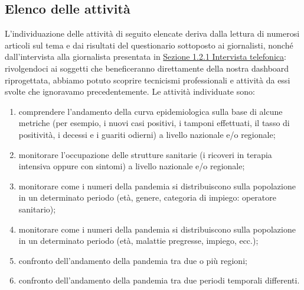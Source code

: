 \subsection{Elenco delle attività}
\label{ss:elenco-attivita}
L'individuazione delle attività di seguito elencate deriva dalla lettura di numerosi articoli sul tema e dai risultati del questionario sottoposto ai giornalisti, nonché dall'intervista alla giornalista presentata in \hyperref[ss:intervista-telefonica]{Sezione 1.2.1 Intervista telefonica}: rivolgendoci ai soggetti che beneficeranno direttamente della nostra dashboard riprogettata, abbiamo potuto scoprire tecnicismi professionali e attività da essi svolte che ignoravamo precedentemente.
\noindent
Le attività individuate sono:
\begin{enumerate}
    \item comprendere l'andamento della curva epidemiologica sulla base di alcune metriche (per esempio, i nuovi casi positivi, i tamponi effettuati, il tasso di positività, i decessi e i guariti odierni) a livello nazionale e/o regionale;\label{itm:1}
    \item monitorare l'occupazione delle strutture sanitarie (i ricoveri in terapia intensiva oppure con sintomi) a livello nazionale e/o regionale;\label{itm:2}
    \item monitorare come i numeri della pandemia si distribuiscono sulla popolazione in un determinato periodo (età, genere, categoria di impiego: operatore sanitario);\label{itm:3}
    \item monitorare come i numeri della pandemia si distribuiscono sulla popolazione in un determinato periodo (età, malattie pregresse, impiego, ecc.);\label{itm:4}
    \item confronto dell'andamento della pandemia tra due o più regioni;\label{itm:5}
    \item confronto dell'andamento della pandemia tra due periodi temporali differenti.\label{itm:6}
\end{enumerate}

